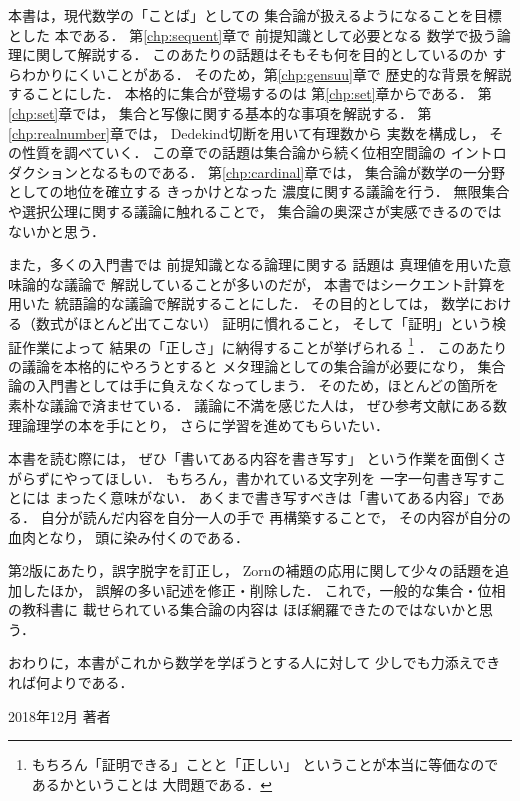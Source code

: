 本書は，現代数学の「ことば」としての
集合論が扱えるようになることを目標とした
本である．
第\ref{chp:sequent}章で
前提知識として必要となる
数学で扱う論理に関して解説する．
このあたりの話題はそもそも何を目的としているのか
すらわかりにくいことがある．
そのため，第\ref{chp:gensuu}章で
歴史的な背景を解説することにした．
本格的に集合が登場するのは
第\ref{chp:set}章からである．
第\ref{chp:set}章では，
集合と写像に関する基本的な事項を解説する．
第\ref{chp:realnumber}章では，
Dedekind切断を用いて有理数から
実数を構成し，
その性質を調べていく．
この章での話題は集合論から続く位相空間論の
イントロダクションとなるものである．
第\ref{chp:cardinal}章では，
集合論が数学の一分野としての地位を確立する
きっかけとなった
濃度に関する議論を行う．
無限集合や選択公理に関する議論に触れることで，
集合論の奥深さが実感できるのではないかと思う．

また，多くの入門書では
前提知識となる論理に関する
話題は
真理値を用いた意味論的な議論で
解説していることが多いのだが，
本書ではシークエント計算を用いた
統語論的な議論で解説することにした．
その目的としては，
数学における（数式がほとんど出てこない）
証明に慣れること，
そして「証明」という検証作業によって
結果の「正しさ」に納得することが挙げられる
\footnote{%
  もちろん「証明できる」ことと「正しい」
  ということが本当に等価なのであるかということは
  大問題である．
}%
．
このあたりの議論を本格的にやろうとすると
メタ理論としての集合論が必要になり，
集合論の入門書としては手に負えなくなってしまう．
そのため，ほとんどの箇所を素朴な議論で済ませている．
議論に不満を感じた人は，
ぜひ参考文献にある数理論理学の本を手にとり，
さらに学習を進めてもらいたい．


本書を読む際には，
ぜひ「書いてある内容を書き写す」
という作業を面倒くさがらずにやってほしい．
もちろん，書かれている文字列を
一字一句書き写すことには
まったく意味がない．
あくまで書き写すべきは「書いてある内容」である．
自分が読んだ内容を自分一人の手で
再構築することで，
その内容が自分の血肉となり，
頭に染み付くのである．










第2版にあたり，誤字脱字を訂正し，
Zornの補題の応用に関して少々の話題を追加したほか，
誤解の多い記述を修正・削除した．
これで，一般的な集合・位相の教科書に
載せられている集合論の内容は
ほぼ網羅できたのではないかと思う．


おわりに，本書がこれから数学を学ぼうとする人に対して
少しでも力添えできれば何よりである．
\begin{flushright}
  2018年12月 著者
\end{flushright}
